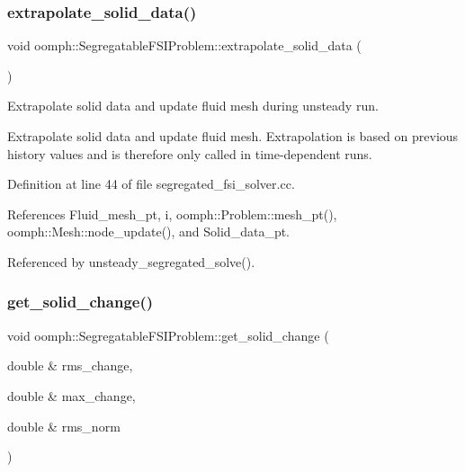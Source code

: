 \subsubsection{\texorpdfstring{extrapolate\+\_\+solid\+\_\+data()}{extrapolate\_solid\_data()}}
{\footnotesize\ttfamily void oomph\+::\+Segregatable\+F\+S\+I\+Problem\+::extrapolate\+\_\+solid\+\_\+data (\begin{DoxyParamCaption}{ }\end{DoxyParamCaption})\hspace{0.3cm}{\ttfamily [private]}}



Extrapolate solid data and update fluid mesh during unsteady run. 

Extrapolate solid data and update fluid mesh. Extrapolation is based on previous history values and is therefore only called in time-\/dependent runs. 

Definition at line 44 of file segregated\+\_\+fsi\+\_\+solver.\+cc.



References Fluid\+\_\+mesh\+\_\+pt, i, oomph\+::\+Problem\+::mesh\+\_\+pt(), oomph\+::\+Mesh\+::node\+\_\+update(), and Solid\+\_\+data\+\_\+pt.



Referenced by unsteady\+\_\+segregated\+\_\+solve().

\mbox{\label{classoomph_1_1SegregatableFSIProblem_ad0792ffce87f26d8963846c472f13d08}} 
\subsubsection{\texorpdfstring{get\+\_\+solid\+\_\+change()}{get\_solid\_change()}}
{\footnotesize\ttfamily void oomph\+::\+Segregatable\+F\+S\+I\+Problem\+::get\+\_\+solid\+\_\+change (\begin{DoxyParamCaption}\item[{double \&}]{rms\+\_\+change,  }\item[{double \&}]{max\+\_\+change,  }\item[{double \&}]{rms\+\_\+norm }\end{DoxyParamCaption})}



